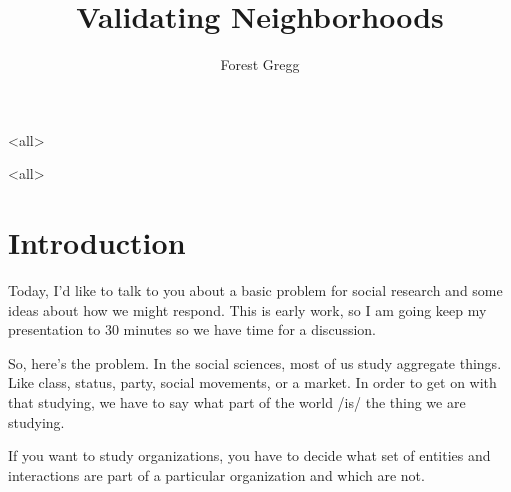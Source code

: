 
\usepackage[english]{babel}
\usepackage{tikz}
\newcommand{\fadeitem}[2]{\item[]\uncover<#1>{#2}}
\title{Validating Neighborhoods}
\author{Forest Gregg}

\mode*
\maketitle

\mode<all>{
}

\mode<all>{
\blackout{}
}  

\section{Introduction}
Today, I'd like to talk to you about a basic problem for social
research and some ideas about how we might respond. This is early
work, so I am going keep my presentation to 30 minutes so we have time
for a discussion.

So, here's the problem. In the social sciences, most of us study
aggregate things. Like class, status, party, social movements, or a
market. In order to get on with that studying, we have to say what
part of the world /is/ the thing we are studying.

If you want to study organizations, you have to decide what set of
entities and interactions are part of a particular organization and
which are not.

